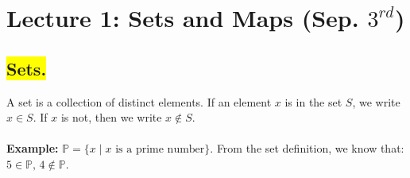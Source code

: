 \section*{Lecture 1: Sets and Maps (Sep. $3^{rd}$)}

\subsection*{\colorbox{yellow}{Sets.}}
\qquad A set is a collection of distinct elements. If an element \(x\) is in the set \(S\), we write \(x \in S\). If \(x\) is not, then we write \(x \notin S\).\\ 
\, \\
\textbf{Example:} $\mathbb{P} = \{ x \mid x \text{ is a prime number} \}$. From the set definition, we know that: \(5 \in \mathbb{P},\, 4 \notin \mathbb{P}\).\\

